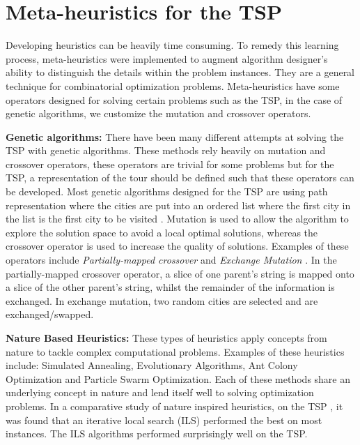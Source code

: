 \documentclass[]{UCD_CS_FYP_Report}
\begin{document}
\newpage
\section{Meta-heuristics for the TSP}
Developing heuristics can be heavily time consuming. To remedy this learning process, meta-heuristics were implemented to augment algorithm designer’s ability to distinguish the details within the problem instances. They are a general technique for combinatorial optimization problems. Meta-heuristics have some operators designed for solving certain problems such as the TSP, in the case of genetic algorithms, we customize the mutation and crossover operators.

\textbf{Genetic algorithms:}
There have been many different attempts at solving the TSP with genetic algorithms. These methods rely heavily on mutation and crossover operators, these operators are trivial for some problems but for the TSP, a representation of the tour should be defined such that these operators can be developed. Most genetic algorithms designed for the TSP are using path representation where the cities are put into an ordered list where the first city in the list is the first city to be visited \cite{Larranaga1999}. Mutation is used to allow the algorithm to explore the solution space to avoid a local optimal solutions, whereas the crossover operator is used to increase the quality of solutions. Examples of these operators include \textit{Partially-mapped crossover} \cite{PartialCrossover} and  \textit{Exchange Mutation} \cite{ExchangeMutation}. In the partially-mapped crossover operator, a slice of one parent's string is mapped onto a slice of the other parent's string, whilst the remainder of the information is exchanged. In exchange mutation, two random cities are selected and are exchanged/swapped.

\textbf{Nature Based Heuristics:}
These types of heuristics apply concepts from nature to tackle complex computational problems. Examples of these heuristics include: Simulated Annealing, Evolutionary Algorithms, Ant Colony Optimization and Particle Swarm Optimization. Each of these methods share an underlying concept in nature and lend itself well to solving optimization problems. In a comparative study of nature inspired heuristics, on the TSP \cite{NatureBasedHeuristics}, it was found that an iterative local search (ILS) performed the best on most instances. The ILS algorithms performed surprisingly well on the TSP. 


\end{document}
